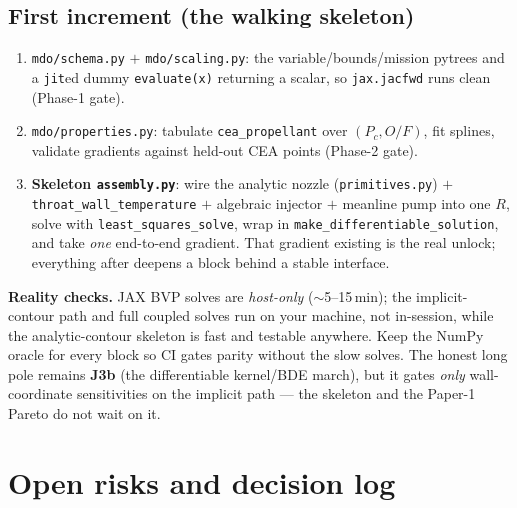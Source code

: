 \documentclass[11pt]{article}
\newcommand{\cmd}[1]{\nolinkurl{#1}}
\begin{document}
\subsection{First increment (the walking skeleton)}
\begin{enumerate}[leftmargin=1.5em,itemsep=2pt]
\item \cmd{mdo/schema.py} $+$ \cmd{mdo/scaling.py}: the variable/bounds/mission
pytrees and a \cmd{jit}ed dummy \cmd{evaluate(x)} returning a scalar, so
\cmd{jax.jacfwd} runs clean (Phase-1 gate).
\item \cmd{mdo/properties.py}: tabulate \cmd{cea\_propellant} over $(P_c,O/F)$,
fit splines, validate gradients against held-out CEA points (Phase-2 gate).
\item \textbf{Skeleton \cmd{assembly.py}}: wire the analytic nozzle
(\cmd{primitives.py}) $+$ \cmd{throat\_wall\_temperature} $+$ algebraic injector
$+$ meanline pump into one $R$, solve with \cmd{least\_squares\_solve}, wrap in
\cmd{make\_differentiable\_solution}, and take \emph{one} end-to-end gradient.
That gradient existing is the real unlock; everything after deepens a block
behind a stable interface.
\end{enumerate}

\begin{warnbox}
\textbf{Reality checks.} JAX BVP solves are \emph{host-only} ($\sim$5--15\,min);
the implicit-contour path and full coupled solves run on your machine, not
in-session, while the analytic-contour skeleton is fast and testable anywhere.
Keep the NumPy oracle for every block so CI gates parity without the slow solves.
The honest long pole remains \textbf{J3b} (the differentiable kernel/BDE march),
but it gates \emph{only} wall-coordinate sensitivities on the implicit path --- the
skeleton and the Paper-1 Pareto do not wait on it.
\end{warnbox}

\section{Open risks and decision log}
\end{document}
